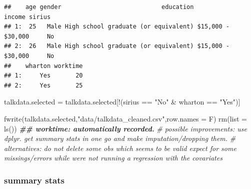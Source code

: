 \documentclass[
  12pt,
]{article}
\newenvironment{Shaded}{\begin{snugshade}}{\end{snugshade}}
\newcommand{\AttributeTok}[1]{\textcolor[rgb]{0.77,0.63,0.00}{#1}}
\newcommand{\CommentTok}[1]{\textcolor[rgb]{0.56,0.35,0.01}{\textit{#1}}}
\newcommand{\DocumentationTok}[1]{\textcolor[rgb]{0.56,0.35,0.01}{\textbf{\textit{#1}}}}
\newcommand{\FunctionTok}[1]{\textcolor[rgb]{0.00,0.00,0.00}{#1}}
\newcommand{\NormalTok}[1]{#1}
\newcommand{\OtherTok}[1]{\textcolor[rgb]{0.56,0.35,0.01}{#1}}
\newcommand{\SpecialCharTok}[1]{\textcolor[rgb]{0.00,0.00,0.00}{#1}}
\newcommand{\StringTok}[1]{\textcolor[rgb]{0.31,0.60,0.02}{#1}}
\begin{document}
\begin{verbatim}
##    age gender                            education            income sirius
## 1:  25   Male High school graduate (or equivalent) $15,000 - $30,000     No
## 2:  26   Male High school graduate (or equivalent) $15,000 - $30,000     No
##    wharton worktime
## 1:     Yes       20
## 2:     Yes       25
\end{verbatim}

\begin{Shaded}
\begin{Highlighting}[]
\NormalTok{talkdata.selected }\OtherTok{=}\NormalTok{ talkdata.selected[}\SpecialCharTok{!}\NormalTok{(sirius }\SpecialCharTok{==} \StringTok{"No"} \SpecialCharTok{\&}\NormalTok{ wharton }\SpecialCharTok{==} \StringTok{"Yes"}\NormalTok{)]}

\FunctionTok{fwrite}\NormalTok{(talkdata.selected,}\StringTok{"data/talkdata\_cleaned.csv"}\NormalTok{,}\AttributeTok{row.names =}\NormalTok{ F)}
\FunctionTok{rm}\NormalTok{(}\AttributeTok{list =} \FunctionTok{ls}\NormalTok{())}
\DocumentationTok{\#\# worktime: automatically recorded.}
\CommentTok{\# possible improvements: use dplyr. get summary stats in one go and make imputation/dropping them.}
\CommentTok{\# alternatives: do not delete some obs which seems to be valid expect for some missings/errors while we\textquotesingle{}re not running a regression with the covariates}
\end{Highlighting}
\end{Shaded}

\hypertarget{summary-stats}{%
\subsubsection{summary stats}\label{summary-stats}}
\end{document}
